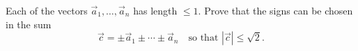 Each of the vectors $\vec a_1, \ldots, \vec a_n$ has length $\leq 1$. Prove that the signs can be chosen in the sum
\[ \vec c = \pm\vec a_1 \pm \cdots \pm \vec a_n \quad\text{so that } |\vec c| \leq \sqrt{2}. \]
